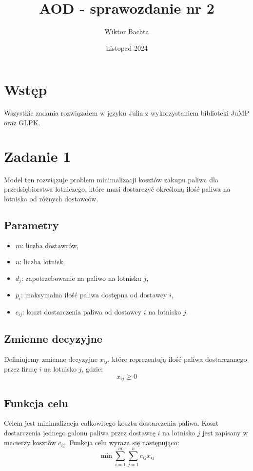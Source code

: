 \documentclass[12pt, letterpaper]{article}
\title{AOD - sprawozdanie nr 2}
\author{Wiktor Bachta}
\date{Listopad 2024}
\begin{document}
\maketitle

\section{Wstęp}

Wszystkie zadania rozwiązałem w języku Julia z wykorzystaniem biblioteki JuMP
oraz GLPK.

\section{Zadanie 1}

Model ten rozwiązuje problem minimalizacji kosztów zakupu paliwa dla
przedsiębiorstwa lotniczego, które musi dostarczyć określoną ilość paliwa na
lotniska od różnych dostawców.

\subsection{Parametry}
\begin{itemize}
  \item \( m \): liczba dostawców,
  \item \( n \): liczba lotnisk,
  \item \( d_j \): zapotrzebowanie na paliwo na lotnisku \( j \),
  \item \( p_i \): maksymalna ilość paliwa dostępna od dostawcy \( i \),
  \item \( c_{ij} \): koszt dostarczenia paliwa od dostawcy \( i \) na lotnisko
        \( j \).
\end{itemize}

\subsection{Zmienne decyzyjne}
Definiujemy zmienne decyzyjne \( x_{ij} \), które reprezentują ilość paliwa
dostarczanego przez firmę \( i \) na lotnisko \( j \), gdzie:
\[
  x_{ij} \geq 0
\]

\subsection{Funkcja celu}
Celem jest minimalizacja całkowitego kosztu dostarczenia paliwa. Koszt
dostarczenia jednego galonu paliwa przez dostawcę \( i \) na lotnisko \( j \)
jest zapisany w macierzy kosztów \( c_{ij} \). Funkcja celu wyraża się
następująco:
\[
  \min \sum_{i=1}^m \sum_{j=1}^n c_{ij} x_{ij}
\]
\end{document}

